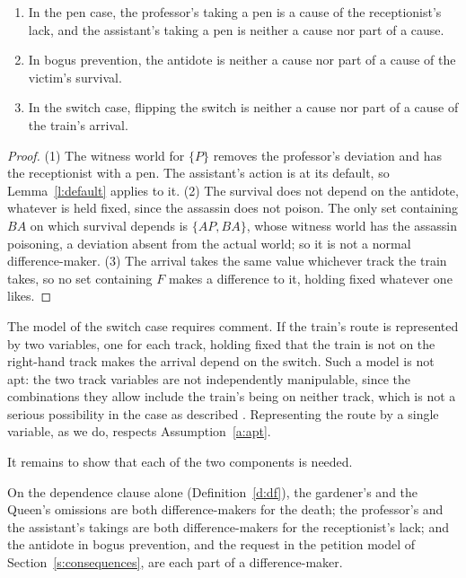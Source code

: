 \documentclass{situationist-preprint}
\begin{document}
\begin{theorem}\label{t:further}
\begin{enumerate}
\item In the pen case, the professor's taking a pen is a cause of the receptionist's lack, and the assistant's taking a pen is neither a cause nor part of a cause.
\item In bogus prevention, the antidote is neither a cause nor part of a cause of the victim's survival.
\item In the switch case, flipping the switch is neither a cause nor part of a cause of the train's arrival.
\end{enumerate}
\end{theorem}

\begin{proof}
(1) The witness world for $\{P\}$ removes the professor's deviation and has the receptionist with a pen. The assistant's action is at its default, so Lemma~\ref{l:default} applies to it. (2) The survival does not depend on the antidote, whatever is held fixed, since the assassin does not poison. The only set containing $\mathit{BA}$ on which survival depends is $\{\mathit{AP}, \mathit{BA}\}$, whose witness world has the assassin poisoning, a deviation absent from the actual world; so it is not a normal difference-maker. (3) The arrival takes the same value whichever track the train takes, so no set containing $F$ makes a difference to it, holding fixed whatever one likes.
\end{proof}

The model of the switch case requires comment. If the train's route is represented by two variables, one for each track, holding fixed that the train is not on the right-hand track makes the arrival depend on the switch. Such a model is not apt: the two track variables are not independently manipulable, since the combinations they allow include the train's being on neither track, which is not a serious possibility in the case as described \citep{HalpernHitchcock2010}. Representing the route by a single variable, as we do, respects Assumption~\ref{a:apt}.

It remains to show that each of the two components is needed.

\begin{proposition}\label{p:depalone}
On the dependence clause alone (Definition~\ref{d:df}), the gardener's and the Queen's omissions are both difference-makers for the death; the professor's and the assistant's takings are both difference-makers for the receptionist's lack; and the antidote in bogus prevention, and the request in the petition model of Section~\ref{s:consequences}, are each part of a difference-maker.
\end{proposition}
\end{document}
